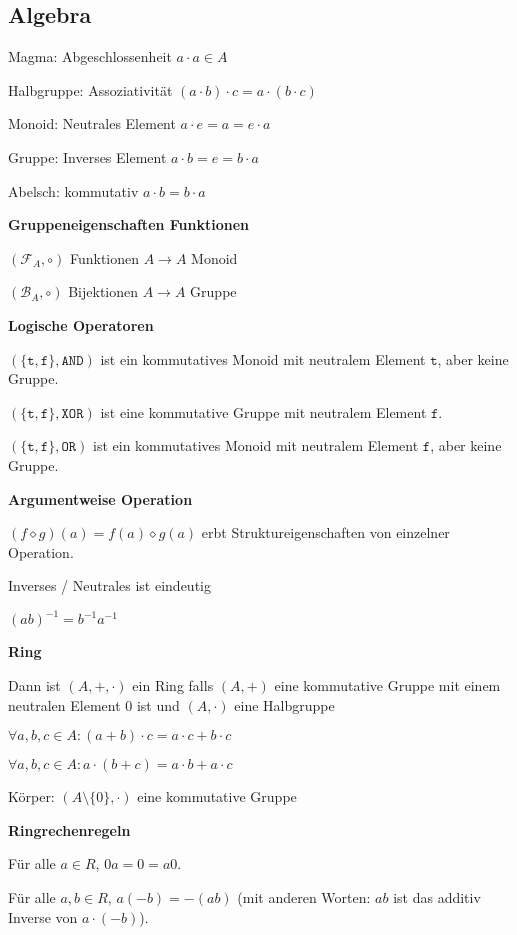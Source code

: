 \documentclass[a4paper,10pt]{article}
\begin{document}
\begin{multicols}{3}
\section{Algebra}

Magma: Abgeschlossenheit $a \cdot a \in A$

Halbgruppe: Assoziativität $(a \cdot b) \cdot c = a \cdot (b \cdot c)$

Monoid: Neutrales Element $a \cdot e = a = e \cdot a$

Gruppe: Inverses Element $a \cdot b = e = b \cdot a$

Abelsch: kommutativ $a \cdot b = b \cdot a$

\textbf{Gruppeneigenschaften Funktionen}

$(\mathcal{F}_A,\circ)$ Funktionen $A\to A$ Monoid

$(\mathcal{B}_A,\circ)$ Bijektionen $A\to A$ Gruppe

\textbf{Logische Operatoren}

$(\{\mathtt{t},\mathtt{f}\},\mathtt{AND})$ ist ein kommutatives Monoid mit neutralem Element $\mathtt{t}$, aber keine Gruppe.

$(\{\mathtt{t},\mathtt{f}\},\mathtt{XOR})$ ist eine kommutative Gruppe mit neutralem Element $\mathtt{f}$.

$(\{\mathtt{t},\mathtt{f}\},\mathtt{OR})$ ist ein kommutatives Monoid mit neutralem Element $\mathtt{f}$, aber keine Gruppe.

\textbf{Argumentweise Operation}

$(f \diamond g) (a) = f(a) \diamond g(a)$ erbt Struktureigenschaften von einzelner Operation.

Inverses / Neutrales ist eindeutig

$(ab)^{-1} = b^{-1} a^{-1}$

\textbf{Ring}

Dann ist $(A,+,\cdot)$ ein Ring falls $(A,+)$ eine kommutative Gruppe mit einem neutralen Element $0$ ist und $(A, \cdot)$ eine Halbgruppe

$\forall a,b,c \in A: (a+b)\cdot c = a\cdot c + b \cdot c$

$\forall a,b,c \in A: a\cdot(b+c) = a\cdot b + a \cdot c$

Körper: $(A \setminus \{0\},\cdot)$ eine kommutative Gruppe

\textbf{Ringrechenregeln}

Für alle $a \in R$, $0a = 0 = a0$.

Für alle $a,b \in R$, $a(-b) = -(ab)$ (mit anderen Worten: $ab$ ist das additiv Inverse von $a \cdot (-b)$).


\end{multicols}
\end{document}
